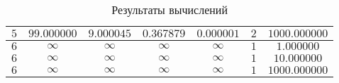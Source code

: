 \begin{table}[h!]
\begin{center}
\begin{tabular}{|c|c|c|c|c|c|c|}
 $5$ &  $99.000000$ & $9.000045$ & $0.367879$ & $0.000001$ & $2$ & $1000.000000$ \\ \hline 

 $6$ &  $\infty$ & $\infty$ & $\infty$ & $\infty$ & $1$ & $1.000000$ \\ \hline 

 $6$ &  $\infty$ & $\infty$ & $\infty$ & $\infty$ & $1$ & $10.000000$ \\ \hline 

 $6$ &  $\infty$ & $\infty$ & $\infty$ & $\infty$ & $1$ & $1000.000000$ \\ \hline 
\end{tabular} 
\end{center}\caption{Результаты вычислений}  
\label{Aggreg1CU} \end{table} 
 